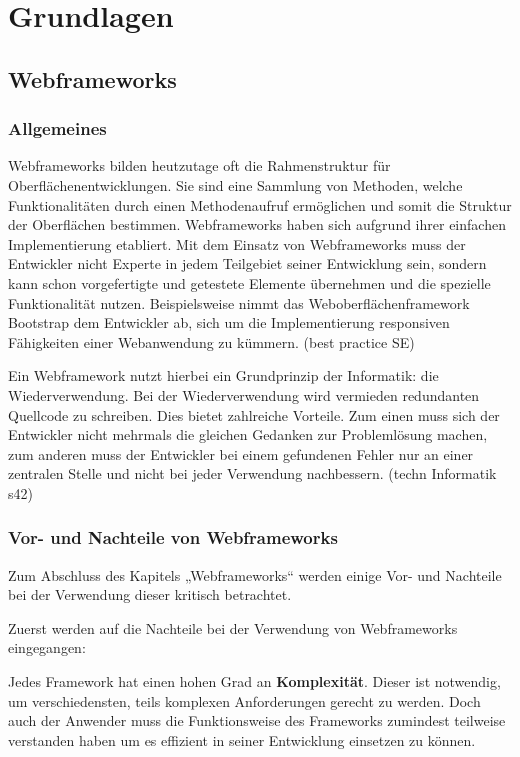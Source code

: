 
\chapter{Grundlagen}


\section{Webframeworks}
\subsection{Allgemeines}

Webframeworks bilden heutzutage oft die Rahmenstruktur für Oberflächenentwicklungen. Sie sind eine Sammlung von Methoden, welche Funktionalitäten durch einen Methodenaufruf ermöglichen und somit die Struktur der Oberflächen bestimmen. Webframeworks haben sich aufgrund ihrer einfachen Implementierung etabliert. Mit dem Einsatz von Webframeworks muss der Entwickler nicht Experte in jedem Teilgebiet seiner Entwicklung sein, sondern kann schon vorgefertigte und getestete Elemente übernehmen und die spezielle Funktionalität nutzen. Beispielsweise nimmt das Weboberflächenframework Bootstrap dem Entwickler ab, sich um die Implementierung responsiven Fähigkeiten einer Webanwendung zu kümmern.\autocites[vgl.][312\psqq]{Schatten2010}  (best practice SE)

Ein Webframework nutzt hierbei ein Grundprinzip der Informatik: die Wiederverwendung. Bei der Wiederverwendung wird vermieden redundanten Quellcode zu schreiben. Dies bietet zahlreiche Vorteile. Zum einen muss sich der Entwickler nicht mehrmals die gleichen Gedanken zur Problemlösung machen, zum anderen muss der Entwickler bei einem gefundenen Fehler nur an einer zentralen Stelle und nicht bei jeder Verwendung nachbessern.\autocites[vgl.][30\psqq]{Woiwode.2018} 
 (techn Informatik s42)


\subsection{Vor- und Nachteile von Webframeworks}

Zum Abschluss des Kapitels „Webframeworks“ werden einige Vor- und Nachteile bei der Verwendung dieser kritisch betrachtet. 

Zuerst werden auf die Nachteile bei der Verwendung von Webframeworks eingegangen:

Jedes Framework hat einen hohen Grad an \textbf{Komplexität}. Dieser ist notwendig, um verschiedensten, teils komplexen Anforderungen gerecht zu werden. Doch auch der Anwender muss die Funktionsweise des Frameworks zumindest teilweise verstanden haben um es effizient in seiner Entwicklung einsetzen zu können.

